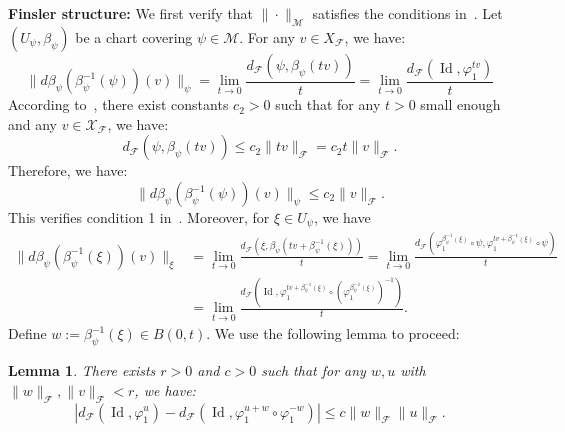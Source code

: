\documentclass[12pt]{amsart}
\numberwithin{equation}{section}
\newtheorem{lemma}{Lemma}[section]
\theoremstyle{remark}
\begin{document}
    \textbf{Finsler structure:} We first verify that $\|\cdot\|_{\mathcal M}$ satisfies the conditions in~.
    Let $(U_\psi, \beta_\psi)$ be a chart covering $\psi\in \mathcal M$. For any $v\in X_{\mathcal F}$, we have:
    \begin{equation}
        \label{eq:derivative_chart}
        \|d\beta_\psi(\beta_\psi^{-1}(\psi))(v)\|_\psi = \lim_{t\to 0} \frac{d_{\mathcal F}(\psi, \beta_\psi(tv))}{t} = \lim_{t\to 0} \frac{d_{\mathcal F}(\operatorname{Id}, \varphi_1^{tv})}{t}
    \end{equation}
According to~, there exist constants $c_2>0$ such that for any $t>0$ small enough and any $v\in \mathcal X_{\mathcal F}$, we have:
\begin{equation}
    d_{\mathcal F}(\psi, \beta_\psi(tv)) \le c_2 \|tv\|_{\mathcal F} = c_2 t \|v\|_{\mathcal F}.
\end{equation}
Therefore, we have:
\begin{equation}
    \|d\beta_\psi(\beta_\psi^{-1}(\psi))(v)\|_\psi \le c_2 \|v\|_{\mathcal F}.
\end{equation}
This verifies condition 1 in~.
Moreover, for $\xi\in U_{\psi}$, we have
\begin{equation}
    \begin{aligned}
            \|d\beta_\psi(\beta_\psi^{-1}(\xi))(v)\|_\xi
            & = \lim_{t\to 0} \frac{d_{\mathcal F}(\xi, \beta_\psi(tv+\beta_\psi^{-1}(\xi)))}{t} = \lim_{t\to 0} \frac{d_{\mathcal F}(\varphi_1^{\beta_\psi^{-1}(\xi)}\circ \psi, \varphi_1^{tv+\beta_\psi^{-1}(\xi)}\circ \psi)}{t}\\
            & = \lim_{t\to 0} \frac{d_{\mathcal F}\left(\operatorname{Id}, \varphi_1^{tv+\beta_\psi^{-1}(\xi)}\circ \left(\varphi_1^{\beta_\psi^{-1}(\xi)}\right)^{-1}\right)}{t}.
    \end{aligned}
\end{equation}
Define $w:=\beta_\psi^{-1}(\xi)\in B(0,t)$. We use the following lemma to proceed:
\begin{lemma}
    There exists $r>0$ and $c>0$ such that for any $w, u$ with $\|w\|_{\mathcal F}, \|v\|_{\mathcal F}<r$, we have:
    \begin{equation}
        |d_{\mathcal F}(\operatorname{Id}, \varphi_1^{u})-d_{\mathcal F}(\operatorname{Id}, \varphi_1^{u+w}\circ \varphi_1^{-w})| \le c\|w\|_{\mathcal F} \|u\|_{\mathcal F}.
    \end{equation}
\end{lemma}
\end{document}
